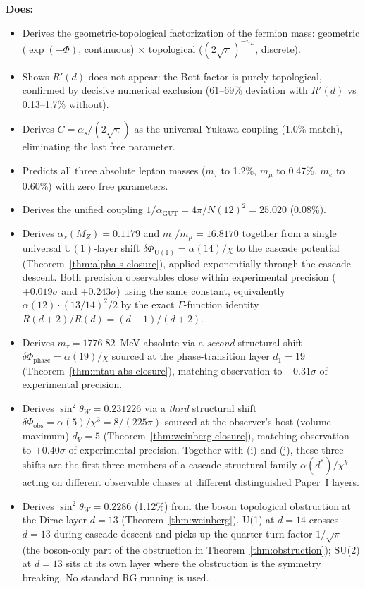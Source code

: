 \documentclass[12pt,a4paper]{article}
\begin{document}
\textbf{Does:}
\begin{itemize}
\item Derives the geometric-topological factorization of the fermion mass: geometric ($\exp(-\Phi)$, continuous) $\times$ topological ($(2\sqrt{\pi})^{-n_D}$, discrete).
\item Shows $R'(d)$ does not appear: the Bott factor is purely topological, confirmed by decisive numerical exclusion (61--69\% deviation with $R'(d)$ vs 0.13--1.7\% without).
\item Derives $C = \alpha_s/(2\sqrt{\pi})$ as the universal Yukawa coupling (1.0\% match), eliminating the last free parameter.
\item Predicts all three absolute lepton masses ($m_\tau$ to 1.2\%, $m_\mu$ to 0.47\%, $m_e$ to 0.60\%) with zero free parameters.
\item Derives the unified coupling $1/\alpha_{\text{GUT}} = 4\pi/N(12)^2 = 25.020$ (0.08\%).
\item Derives $\alpha_s(M_Z) = 0.1179$ and $m_\tau/m_\mu = 16.8170$ together from a single universal $\mathrm{U}(1)$-layer shift $\delta\Phi_{\mathrm{U}(1)}=\alpha(14)/\chi$ to the cascade potential (Theorem~\ref{thm:alpha-s-closure}), applied exponentially through the cascade descent. Both precision observables close within experimental precision ($+0.019\sigma$ and $+0.243\sigma$) using the same constant, equivalently $\alpha(12)\cdot(13/14)^2/2$ by the exact $\Gamma$-function identity $R(d+2)/R(d)=(d+1)/(d+2)$.
\item Derives $m_\tau = 1776.82$~MeV absolute via a \emph{second} structural shift $\delta\Phi_{\mathrm{phase}}=\alpha(19)/\chi$ sourced at the phase-transition layer $d_1=19$ (Theorem~\ref{thm:mtau-abs-closure}), matching observation to $-0.31\sigma$ of experimental precision.
\item Derives $\sin^2\theta_W = 0.231226$ via a \emph{third} structural shift $\delta\Phi_{\mathrm{obs}}=\alpha(5)/\chi^3=8/(225\pi)$ sourced at the observer's host (volume maximum) $d_V=5$ (Theorem~\ref{thm:weinberg-closure}), matching observation to $+0.40\sigma$ of experimental precision. Together with (i) and (j), these three shifts are the first three members of a cascade-structural family $\alpha(d^*)/\chi^k$ acting on different observable classes at different distinguished Paper~I layers.
\item Derives $\sin^2\theta_W = 0.2286$ (1.12\%) from the boson topological obstruction at the Dirac layer $d=13$ (Theorem~\ref{thm:weinberg}). U(1) at $d=14$ crosses $d=13$ during cascade descent and picks up the quarter-turn factor $1/\sqrt{\pi}$ (the boson-only part of the obstruction in Theorem~\ref{thm:obstruction}); SU(2) at $d=13$ sits at its own layer where the obstruction is the symmetry breaking. No standard RG running is used.

\end{itemize}
\end{document}
